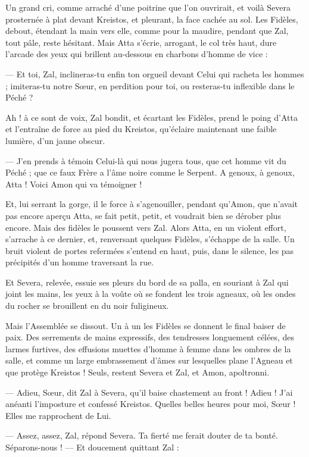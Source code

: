 \documentclass[a4paper, 11pt, oneside, polutonikogreek, french]{article}
\begin{document}
Un grand cri, comme arraché d’une poitrine que l'on ouvrirait, et voilà Severa prosternée à plat devant Kreistos, et pleurant, la face cachée au sol. Les Fidèles, debout, étendant la main vers elle, comme pour la maudire, pendant que Zal, tout pâle, reste hésitant. Mais Atta s'écrie, arrogant, le col très haut, dure l'arcade des yeux qui brillent au-dessous en charbons d'homme de vice :

--- Et toi, Zal, inclineras-tu enfin ton orgueil devant Celui qui racheta les hommes ; imiteras-tu notre Sœur, en perdition pour toi, ou resteras-tu inflexible dans le Péché ?

Ah ! à ce sont de voix, Zal bondit, et écartant les Fidèles, prend le poing d'Atta et l'entraîne de force au pied du Kreistos, qu'éclaire maintenant une faible lumière, d'un jaune obscur.

--- J'en prends à témoin Celui-là qui nous jugera tous, que cet homme vit du Péché ; que ce faux Frère a l'âme noire comme le Serpent. A genoux, à genoux, Atta ! Voici Amon qui va témoigner !

Et, lui serrant la gorge, il le force à s'agenouiller, pendant qu'Amon, que n'avait pas encore aperçu Atta, se fait petit, petit, et voudrait bien se dérober plus encore. Mais des fidèles le poussent vers Zal. Alors Atta, en un violent effort, s'arrache à ce dernier, et, renversant quelques Fidèles, s'échappe de la salle. Un bruit violent de portes refermées s'entend en haut, puis, dans le silence, les pas précipités d'un homme traversant la rue.

Et Severa, relevée, essuie ses pleurs du bord de sa palla, en souriant à Zal qui joint les mains, les yeux à la voûte où se fondent les trois agneaux, où les ondes du rocher se brouillent en du noir fuligineux.

Mais l'Assemblée se dissout. Un à un les Fidèles se donnent le final baiser de paix. Des serrements de mains expressifs, des tendresses longuement célées, des larmes furtives, des effusions muettes d'homme à femme dans les ombres de la salle, et comme un large embrassement d'âmes sur lesquelles plane l'Agneau et que protège Kreistos ! Seuls, restent Severa et Zal, et Amon, apoltronni.

--- Adieu, Sœur, dit Zal à Severa, qu'il baise chastement au front ! Adieu ! J'ai anéanti l'imposture et confessé Kreistos. Quelles belles heures pour moi, Sœur ! Elles me rapprochent de Lui.

--- Assez, assez, Zal, répond Severa. Ta fierté me ferait douter de ta bonté. Séparons-nous ! --- Et doucement quittant Zal :
\end{document}

